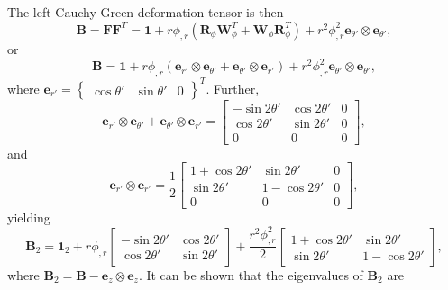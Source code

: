\documentclass[12pt]{article}
\begin{document}
The left Cauchy-Green deformation tensor is then
\begin{equation}
	\mathbf{B} = \mathbf{F} \mathbf{F}^T = \mathbf{1} + r \phi_{,r} (\mathbf{R}_\phi \mathbf{W}_\phi^T + \mathbf{W}_\phi \mathbf{R}_\phi^T) + r^2 \phi_{,r}^2 \mathbf{e}_{\theta'} \otimes \mathbf{e}_{\theta'},
\end{equation}
or
\begin{equation}
	\mathbf{B} = \mathbf{1} +  r \phi_{,r} (\mathbf{e}_{r'} \otimes \mathbf{e}_{\theta'} + \mathbf{e}_{\theta'} \otimes \mathbf{e}_{r'}) + r^2 \phi_{,r}^2 \mathbf{e}_{\theta'} \otimes \mathbf{e}_{\theta'},
\end{equation}
where $\mathbf{e}_{r'} = \left\{ \begin{array}{ccc} \cos \theta' & \sin \theta' & 0 \end{array} \right\}^T$. Further,
\begin{equation}
	\mathbf{e}_{r'} \otimes \mathbf{e}_{\theta'} + \mathbf{e}_{\theta'} \otimes \mathbf{e}_{r'} = \left[ \begin{array}{ccc} 
	- \sin 2 \theta' & \cos 2 \theta' & 0 \\ 
	\cos 2 \theta' & \sin 2 \theta' & 0 \\ 0 & 0 & 0 \end{array} \right],
\end{equation}
and
\begin{equation}
	\mathbf{e}_{r'} \otimes \mathbf{e}_{r'} = \frac{1}{2} \left[ \begin{array}{ccc} 
	1 + \cos 2 \theta' & \sin 2 \theta' & 0 \\ 
	\sin 2 \theta' & 1 - \cos 2 \theta' & 0 \\ 0 & 0 & 0 \end{array} \right],
\end{equation}
yielding
\begin{equation}
	\mathbf{B}_2 = \mathbf{1}_2 + r \phi_{,r} \left[ \begin{array}{cc} 
	- \sin 2 \theta' & \cos 2 \theta' \\ 
	\cos 2 \theta' & \sin 2 \theta' \end{array} \right] + \frac{r^2 \phi_{,r}^2}{2} \left[ \begin{array}{ccc} 
	1 + \cos 2 \theta' & \sin 2 \theta' \\ 
	\sin 2 \theta' & 1 - \cos 2 \theta' \end{array} \right],
\end{equation}
where $\mathbf{B}_2 = \mathbf{B} - \mathbf{e}_z \otimes \mathbf{e}_z$. It can be shown that the eigenvalues of $\mathbf{B}_2$ are
\end{document}
